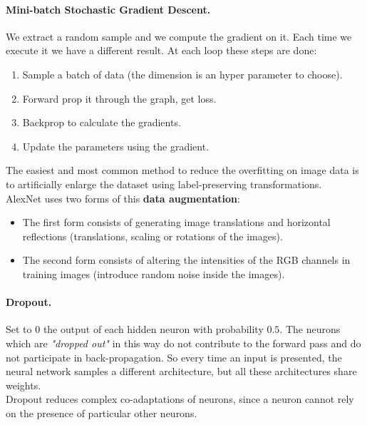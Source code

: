 \paragraph*{Mini-batch Stochastic Gradient Descent.} We extract a random sample and we compute the gradient on it. Each time we execute it we have a different result. At each loop these steps are done:
\begin{enumerate}
	\item Sample a batch of data (the dimension is an hyper parameter to choose).
	\item Forward prop it through the graph, get loss.
	\item Backprop to calculate the gradients.
	\item Update the parameters using the gradient.
\end{enumerate} 

The easiest and most common method to reduce the overfitting on image data is to artificially enlarge the dataset using label-preserving transformations.\\
AlexNet uses two forms of this \textbf{data augmentation}:
\begin{itemize}
	\item The first form consists of generating image translations and horizontal reflections (translations, scaling or rotations of the images).
	\item The second form consists of altering the intensities of the RGB channels in training images (introduce random noise inside the images). 
\end{itemize}

\paragraph*{Dropout.} Set to 0 the output of each hidden neuron with probability $0.5$. The neurons which are \textit{"dropped out"} in this way do not contribute to the forward pass and do not participate in back-propagation. So every time an input is presented, the neural network samples a different architecture, but all these architectures share weights.\\
Dropout reduces complex co-adaptations of neurons, since a neuron cannot rely on the presence of particular other neurons.
